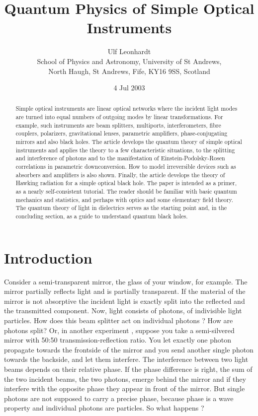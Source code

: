 \documentclass[12pt,amsmath,amssymb]{article}
\numberwithin{equation}{section}
\begin{document}
\date{4 Jul 2003}
\title{\sc Quantum Physics of Simple Optical Instruments}
\author{Ulf Leonhardt\\
School of Physics and Astronomy, University of St Andrews,\\
North Haugh, St Andrews, Fife, KY16 9SS, Scotland}
\maketitle
\begin{abstract}
Simple optical instruments are linear optical networks
where the incident light modes are turned into equal
numbers of outgoing modes by linear transformations.
For example, such instruments are beam splitters, multiports,
interferometers, fibre couplers, polarizers, gravitational lenses,
parametric amplifiers, phase-conjugating mirrors
and also black holes.
The article develops the quantum theory of
simple optical instruments and applies the theory to
a few characteristic situations, to the
splitting and interference of photons and to the
manifestation of Einstein-Podolsky-Rosen correlations
in parametric downconversion.
How to model irreversible devices
such as absorbers and amplifiers is also shown.
Finally, the article develops the theory of Hawking radiation
for a simple optical black hole.
The paper is intended as a primer,
as a nearly self-consistent tutorial.
The reader should be familiar with
basic quantum mechanics and statistics, and perhaps with optics
and some elementary field theory.
The quantum theory of light in dielectrics serves as
the starting point and, in the concluding section,
as a guide to understand quantum black holes.

\end{abstract}
\newpage

\section{Introduction}

Consider a semi-transparent mirror, the glass of your window, for example.
The mirror partially reflects light and is partially transparent.
If the material of the mirror is not absorptive the incident light is
exactly split into the reflected and the transmitted component.
Now, light consists of photons, of indivisible light particles.
How does this beam splitter act on individual photons \cite{Brendel,Paul}?
How are photons split?
Or, in another experiment \cite{Hong},
suppose you take a semi-silvered mirror with 50:50
transmission-reflection ratio.
You let exactly one photon propagate towards the frontside of the mirror
and you send another single photon towards the backside,
and let them interfere.
The interference between two light beams depends on their relative phase.
If the phase difference is right, the sum of the two incident beams,
the two photons, emerge behind the mirror
and if they interfere with the opposite phase they appear in front of the mirror.
But single photons are not supposed to carry a precise phase,
because phase is a wave property and individual photons are particles.
So what happens \cite{Hong,Paul}?
\end{document}
